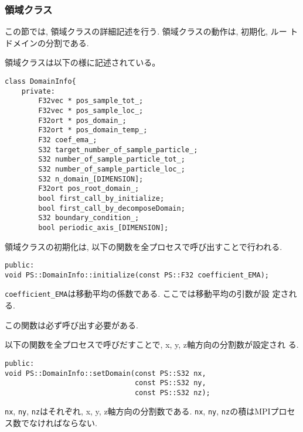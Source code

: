 \subsubsection{領域クラス}
\label{sec:detail_module_domain_info}

この節では, 領域クラスの詳細記述を行う. 領域クラスの動作は, 初期化, ルー
トドメインの分割である.

領域クラスは以下の様に記述されている。
\begin{lstlisting}[caption=DomainInfo]
    class DomainInfo{
    private:
        F32vec * pos_sample_tot_;
        F32vec * pos_sample_loc_;
        F32ort * pos_domain_;
        F32ort * pos_domain_temp_;
        F32 coef_ema_;
        S32 target_number_of_sample_particle_;
        S32 number_of_sample_particle_tot_;
        S32 number_of_sample_particle_loc_;
        S32 n_domain_[DIMENSION];
        F32ort pos_root_domain_;
        bool first_call_by_initialize;
        bool first_call_by_decomposeDomain;
        S32 boundary_condition_;
        bool periodic_axis_[DIMENSION];
\end{lstlisting}


領域クラスの初期化は, 以下の関数を全プロセスで呼び出すことで行われる.
\begin{screen}
\begin{verbatim}
public:
void PS::DomainInfo::initialize(const PS::F32 coefficient_EMA);
\end{verbatim}
\end{screen}

{\tt coefficient\_EMA}は移動平均の係数である. ここでは移動平均の引数が設
定される. 

この関数は必ず呼び出す必要がある.


以下の関数を全プロセスで呼びだすことで, x, y, z軸方向の分割数が設定され
る.
\begin{screen}
\begin{verbatim}
public:
void PS::DomainInfo::setDomain(const PS::S32 nx,
                               const PS::S32 ny,
                               const PS::S32 nz);
\end{verbatim}
\end{screen}

{\tt nx}, {\tt ny}, {\tt nz}はそれぞれ, x, y, z軸方向の分割数である.
{\tt nx}, {\tt ny}, {\tt nz}の積はMPIプロセス数でなければならない. 

